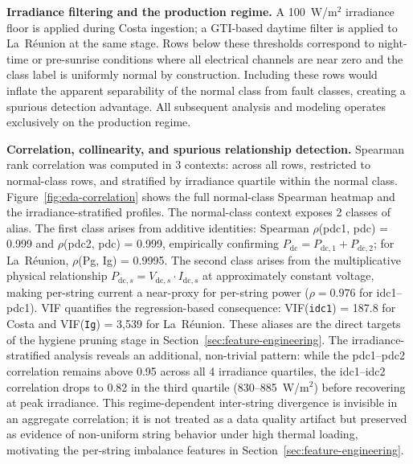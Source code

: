 \textbf{Irradiance filtering and the production regime.} A 100~W/m$^2$ irradiance floor is applied during Costa ingestion; a GTI-based daytime filter is applied to La~Réunion at the same stage. Rows below these thresholds correspond to night-time or pre-sunrise conditions where all electrical channels are near zero and the class label is uniformly normal by construction. Including these rows would inflate the apparent separability of the normal class from fault classes, creating a spurious detection advantage. All subsequent analysis and modeling operates exclusively on the production regime.

\textbf{Correlation, collinearity, and spurious relationship detection.} Spearman rank correlation was computed in 3 contexts: across all rows, restricted to normal-class rows, and stratified by irradiance quartile within the normal class. Figure~\ref{fig:eda-correlation} shows the full normal-class Spearman heatmap and the irradiance-stratified profiles. The normal-class context exposes 2 classes of alias. The first class arises from additive identities: Spearman $\rho$(pdc1, pdc) = 0.999 and $\rho$(pdc2, pdc) = 0.999, empirically confirming $P_{\mathrm{dc}} = P_{\mathrm{dc},1} + P_{\mathrm{dc},2}$; for La~Réunion, $\rho$(Pg, Ig) = 0.9995. The second class arises from the multiplicative physical relationship $P_{\mathrm{dc},s} = V_{\mathrm{dc},s} \cdot I_{\mathrm{dc},s}$ at approximately constant voltage, making per-string current a near-proxy for per-string power ($\rho = 0.976$ for idc1--pdc1). VIF quantifies the regression-based consequence: VIF(\texttt{idc1}) = 187.8 for Costa and VIF(\texttt{Ig}) = 3,539 for La~Réunion. These aliases are the direct targets of the hygiene pruning stage in Section~\ref{sec:feature-engineering}. The irradiance-stratified analysis reveals an additional, non-trivial pattern: while the pdc1--pdc2 correlation remains above 0.95 across all 4 irradiance quartiles, the idc1--idc2 correlation drops to 0.82 in the third quartile (830--885~W/m$^2$) before recovering at peak irradiance. This regime-dependent inter-string divergence is invisible in an aggregate correlation; it is not treated as a data quality artifact but preserved as evidence of non-uniform string behavior under high thermal loading, motivating the per-string imbalance features in Section~\ref{sec:feature-engineering}.

